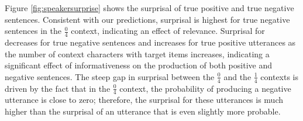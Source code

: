 \documentclass[man, noapacite]{apa2}
\begin{document}



Figure \ref{fig:speakersurprise} shows the surprisal of true positive and true negative sentences.  Consistent with our predictions, surprisal is highest for true negative sentences in the $\frac{0}{4}$ context, indicating an effect of relevance. Surprisal for decreases for true negative sentences and increases for true positive utterances as the number of context characters with target items increases, indicating a significant effect of informativeness on the production of both positive and negative sentences. The steep gap in surprisal between the  $\frac{0}{4}$ and the $\frac{1}{4}$ contexts is driven by the fact that in the  $\frac{0}{4}$ context, the probability of producing a negative utterance is close to zero; therefore, the surprisal for these utterances is much higher than the surprisal of an utterance that is even slightly more probable.
\end{document}
